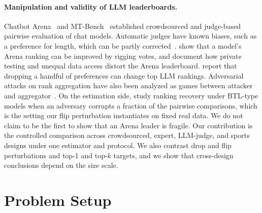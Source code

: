 \documentclass{article}
\begin{document}
\paragraph{Manipulation and validity of LLM leaderboards.}
Chatbot Arena~\citep{Chiang2024ChatbotAA} and MT-Bench~\citep{Zheng2023JudgingLW} established crowdsourced and judge-based pairwise evaluation of chat models. Automatic judges have known biases, such as a preference for length, which can be partly corrected~\citep{Dubois2024LengthControlledAA}. \citet{Min2025ImprovingYM} show that a model's Arena ranking can be improved by rigging votes, and \citet{Singh2025TheLI} document how private testing and unequal data access distort the Arena leaderboard. \citet{Huang2025DroppingJA} report that dropping a handful of preferences can change top LLM rankings. Adversarial attacks on rank aggregation have also been analyzed as games between attacker and aggregator~\citep{Ma2022ATO}. On the estimation side, \citet{Patil2020RankAF} study ranking recovery under BTL-type models when an adversary corrupts a fraction of the pairwise comparisons, which is the setting our flip perturbation instantiates on fixed real data. We do not claim to be the first to show that an Arena leader is fragile. Our contribution is the controlled comparison across crowdsourced, expert, LLM-judge, and sports designs under one estimator and protocol. We also contrast drop and flip perturbations and top-1 and top-$k$ targets, and we show that cross-design conclusions depend on the size scale.

\section{Problem Setup}
\label{sec:setup}
\end{document}
